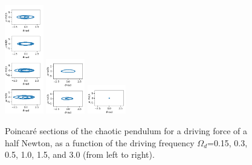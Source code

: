 \documentclass[11pt]{article} %
\begin{document}
\begin{figure}[H]
        \includegraphics[width=0.15\textwidth]{pcr_0.5_1.0.png}
        \includegraphics[width=0.15\textwidth]{pcr_0.5_1.5.png}
        \includegraphics[width=0.15\textwidth]{pcr_0.5_3.0.png}
        \caption{Poincar\'e sections of the chaotic pendulum for a driving force of a half Newton, as a function of the driving frequency $\Omega_d$=0.15, 0.3, 0.5, 1.0, 1.5, and 3.0 (from left to right).}
    \end{figure}
\end{document}
